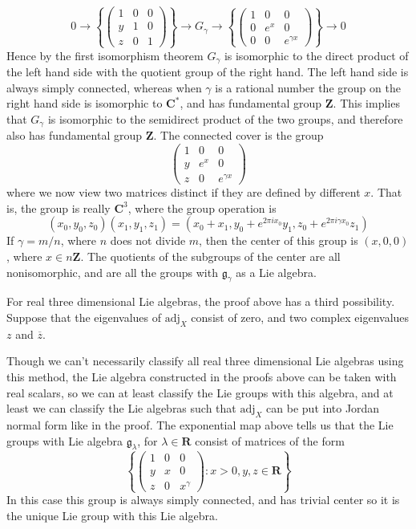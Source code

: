 %
\[ 0 \to \left\{ \begin{pmatrix} 1 & 0 & 0 \\ y & 1 & 0 \\ z & 0 & 1 \end{pmatrix} \right\} \to G_\gamma \to \left\{ \begin{pmatrix} 1 & 0 & 0 \\ 0 & e^x & 0 \\ 0 & 0 & e^{\gamma x} \end{pmatrix} \right\} \to 0 \]
%
Hence by the first isomorphism theorem $G_\gamma$ is isomorphic to the direct product of the left hand side with the quotient group of the right hand. The left hand side is always simply connected, whereas when $\gamma$ is a rational number the group on the right hand side is isomorphic to $\mathbf{C}^*$, and has fundamental group $\mathbf{Z}$. This implies that $G_\gamma$ is isomorphic to the semidirect product of the two groups, and therefore also has fundamental group $\mathbf{Z}$. The connected cover is the group
%
\[ \begin{pmatrix} 1 & 0 & 0 \\ y & e^x & 0 \\ z & 0 & e^{\gamma x} \end{pmatrix} \]
%
where we now view two matrices distinct if they are defined by different $x$. That is, the group is really $\mathbf{C}^3$, where the group operation is
%
\[ (x_0, y_0, z_0)(x_1,y_1,z_1) = (x_0 + x_1 ,y_0 + e^{2 \pi i x_0}y_1, z_0 + e^{2 \pi i \gamma x_0}z_1) \]
%
If $\gamma = m/n$, where $n$ does not divide $m$, then the center of this group is $(x,0,0)$, where $x \in n \mathbf{Z}$. The quotients of the subgroups of the center are all nonisomorphic, and are all the groups with $\mathfrak{g}_\gamma$ as a Lie algebra.

For real three dimensional Lie algebras, the proof above has a third possibility. Suppose that the eigenvalues of $\text{adj}_X$ consist of zero, and two complex eigenvalues $z$ and $\overline{z}$.

Though we can't necessarily classify all real three dimensional Lie algebras using this method, the Lie algebra constructed in the proofs above can be taken with real scalars, so we can at least classify the Lie groups with this algebra, and at least we can classify the Lie algebras such that $\text{adj}_X$ can be put into Jordan normal form like in the proof. The exponential map above tells us that the Lie groups with Lie algebra $\mathfrak{g}_\lambda$, for $\lambda \in \mathbf{R}$ consist of matrices of the form
%
\[ \left\{ \begin{pmatrix} 1 & 0 & 0 \\ y & x & 0 \\ z & 0 & x^\gamma \end{pmatrix} : x > 0, y,z \in \mathbf{R} \right\} \]
%
In this case this group is always simply connected, and has trivial center so it is the unique Lie group with this Lie algebra.

